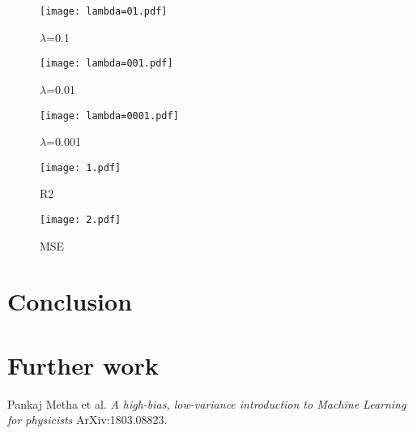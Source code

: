 \documentclass[10pt]{article}
\begin{document}
\begin{figure}
	\centerline{\texttt{[image: lambda=01.pdf]}}
	\caption{$\lambda$=0.1}
	\label{plt:lamda01}
\end{figure}

\begin{figure}
	\centerline{\texttt{[image: lambda=001.pdf]}}
	\caption{$\lambda$=0.01}
	\label{plt:lamda001}
\end{figure}

\begin{figure}
	\centerline{\texttt{[image: lambda=0001.pdf]}}
	\caption{$\lambda$=0.001}
	\label{plt:lamda0001}
\end{figure}

\begin{figure}
	\centerline{\texttt{[image: 1.pdf]}}
	\caption{R2}
	\label{plt:R2"}
\end{figure}

\begin{figure}
	\centerline{\texttt{[image: 2.pdf]}}
	\caption{MSE}
	\label{plt:MSE"}
\end{figure}


\section{Conclusion}

\section{Further work}

\newpage
\begin{thebibliography}{9}
	Pankaj Metha et al. 
	\textit{A high-bias, low-variance introduction to Machine Learning for physicists}
	ArXiv:1803.08823.

	
\end{thebibliography}
\end{document}
